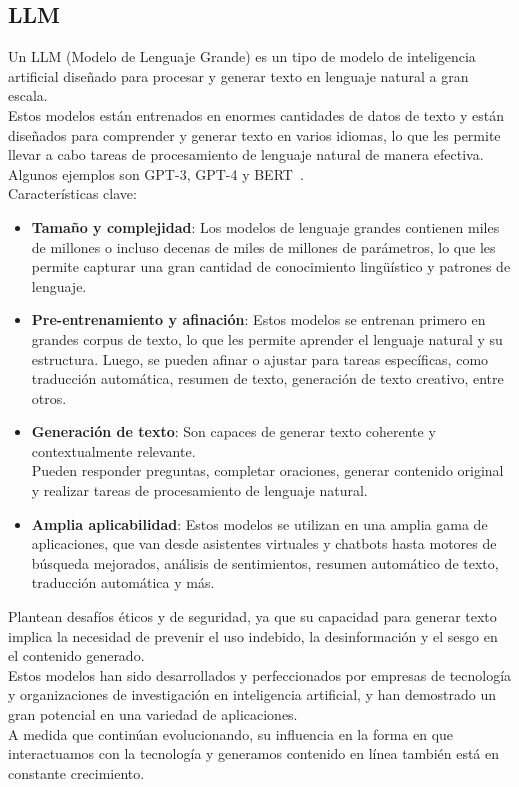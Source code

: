 \subsection{LLM~\cite{mirchandani2023large}}
\label{LLM}
Un LLM (Modelo de Lenguaje Grande) es un tipo de modelo de inteligencia artificial
 diseñado para procesar y generar texto en lenguaje natural a gran escala.\\
Estos modelos están entrenados en enormes cantidades de datos de texto 
y están diseñados para comprender y generar texto en varios idiomas, 
lo que les permite llevar a cabo tareas de procesamiento de lenguaje natural de manera efectiva. \\
Algunos ejemplos son GPT-3, GPT-4 y BERT~\cite{BertSentimentModel1}.\\
Características clave:
\begin{itemize}
    \item \textbf{Tamaño y complejidad}: Los modelos de lenguaje grandes contienen miles de millones o 
    incluso decenas de miles de millones de parámetros, lo que les permite capturar una 
    gran cantidad de conocimiento lingüístico y patrones de lenguaje.
    \item \textbf{Pre-entrenamiento y afinación}: Estos modelos se entrenan primero en grandes corpus de texto, lo que les permite aprender el lenguaje natural y su estructura. Luego, se pueden afinar o ajustar para tareas específicas, como traducción automática, resumen de texto, generación de texto creativo, entre otros.
    \item \textbf{Generación de texto}: Son capaces de generar texto coherente y contextualmente relevante.\\
    Pueden responder preguntas, completar oraciones, generar contenido original 
    y realizar tareas de procesamiento de lenguaje natural.
    \item \textbf{Amplia aplicabilidad}: Estos modelos se utilizan en una amplia gama de aplicaciones, 
    que van desde asistentes virtuales y chatbots hasta motores de búsqueda mejorados, 
    análisis de sentimientos, resumen automático de texto, traducción automática y más.
\end{itemize}
 
Plantean desafíos éticos y de seguridad, ya que su 
capacidad para generar texto implica la necesidad de prevenir el uso indebido, 
la desinformación y el sesgo en el contenido generado.\\
Estos modelos han sido desarrollados y perfeccionados por empresas de tecnología y 
organizaciones de investigación en inteligencia artificial, y han demostrado 
un gran potencial en una variedad de aplicaciones. \\
A medida que continúan evolucionando, su influencia 
en la forma en que interactuamos con la tecnología y generamos contenido 
en línea también está en constante crecimiento.



